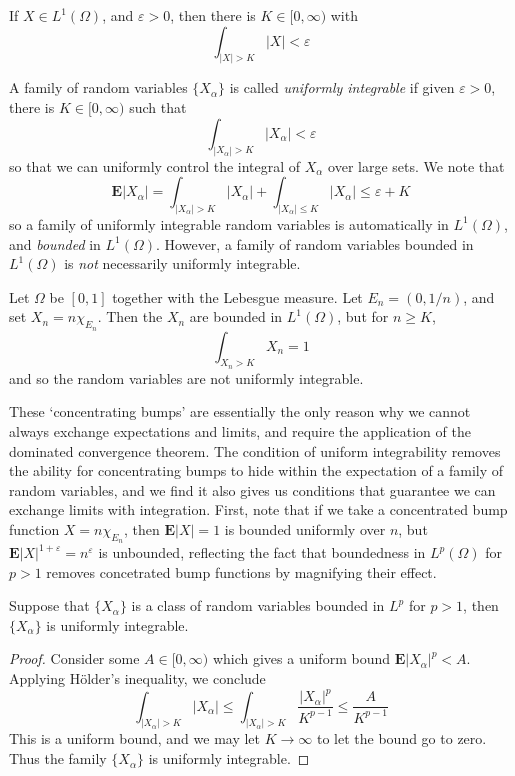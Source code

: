 \begin{corollary}
    If $X \in L^1(\Omega)$, and $\varepsilon > 0$, then there is $K \in [0,\infty)$ with
    \[ \int_{|X| > K} |X| < \varepsilon \]
\end{corollary}

A family of random variables $\{ X_\alpha \}$ is called \emph{uniformly integrable} if given $\varepsilon > 0$, there is $K \in [0,\infty)$ such that
%
\[ \int_{|X_\alpha| > K} |X_\alpha| < \varepsilon \]
%
so that we can uniformly control the integral of $X_\alpha$ over large sets. We note that
%
\[ \mathbf{E} |X_\alpha| = \int_{|X_\alpha| > K} |X_\alpha| + \int_{|X_\alpha| \leq K} |X_\alpha| \leq \varepsilon + K \]
%
so a family of uniformly integrable random variables is automatically in $L^1(\Omega)$, and {\it bounded} in $L^1(\Omega)$. However, a family of random variables bounded in $L^1(\Omega)$ is {\it not} necessarily uniformly integrable.

\begin{example}
    Let $\Omega$ be $[0,1]$ together with the Lebesgue measure. Let $E_n = (0,1/n)$, and set $X_n = n \chi_{E_n}$. Then the $X_n$ are bounded in $L^1(\Omega)$, but for $n \geq K$,
    \[ \int_{X_n > K} X_n = 1 \]
    and so the random variables are not uniformly integrable.
\end{example}

These `concentrating bumps' are essentially the only reason why we cannot always exchange expectations and limits, and require the application of the dominated convergence theorem. The condition of uniform integrability removes the ability for concentrating bumps to hide within the expectation of a family of random variables, and we find it also gives us conditions that guarantee we can exchange limits with integration. First, note that if we take a concentrated bump function $X = n \chi_{E_n}$, then $\mathbf{E}|X| = 1$ is bounded uniformly over $n$, but $\mathbf{E}|X|^{1+\varepsilon} = n^\varepsilon$ is unbounded, reflecting the fact that boundedness in $L^p(\Omega)$ for $p > 1$ removes concetrated bump functions by magnifying their effect.

\begin{theorem}
    Suppose that $\{ X_\alpha \}$ is a class of random variables bounded in $L^p$ for $p > 1$, then $\{ X_\alpha \}$ is uniformly integrable.
\end{theorem}
\begin{proof}
    Consider some $A \in [0,\infty)$ which gives a uniform bound $\mathbf{E} |X_\alpha|^p < A$. Applying H\"{o}lder's inequality, we conclude
    \[ \int_{|X_\alpha| > K} |X_\alpha| \leq \int_{|X_\alpha| > K} \frac{|X_\alpha|^p}{K^{p-1}} \leq \frac{A}{K^{p-1}} \]
    This is a uniform bound, and we may let $K \to \infty$ to let the bound go to zero. Thus the family $\{ X_\alpha \}$ is uniformly integrable.
\end{proof}


